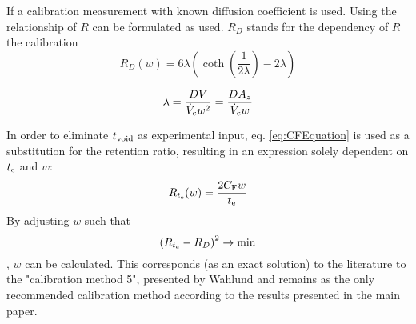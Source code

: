 If a calibration measurement with known diffusion coefficient is used. 
Using the relationship of $R$ can be formulated as used. $R_D$ stands for the dependency of $R$ the calibration
\begin{equation}
R_D(w) = 6\lambda \left( \coth{\left( \frac{1}{2\lambda} \right) } - 2\lambda \right)
\end{equation}

\begin{equation}
\lambda = \frac{D V}{\dot{V}_\text{c} w^2} = \frac{D A_z}{\dot{V}_\text{c} w}
\end{equation}

In order to eliminate $t_\text{void}$ as experimental input, eq. \ref{eq:CFEquation} is used as a substitution for the 
retention ratio, resulting in an expression solely dependent on $t_\text{e}$ and $w$:
\begin{equation}
R_{t_\text{e}}(w) = \frac{2 C_\text{F} w}{t_\text{e}}
\end{equation}
By adjusting $w$ such that \[\left( R_{t_\text{e}} - R_D \right)^2 \rightarrow \min\],
$w$ can be calculated. This corresponds (as an exact solution) to the literature to the "calibration method 5", 
presented by Wahlund  and remains as the only recommended calibration method according to the 
results presented in the main paper.